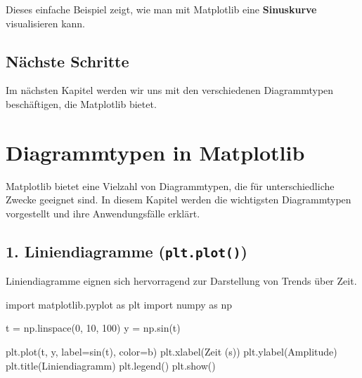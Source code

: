 \documentclass[
  letterpaper,
  DIV=11,
  numbers=noendperiod]{scrreprt}
\newenvironment{Shaded}{\begin{snugshade}}{\end{snugshade}}
\newcommand{\DecValTok}[1]{\textcolor[rgb]{0.68,0.00,0.00}{#1}}
\newcommand{\ImportTok}[1]{\textcolor[rgb]{0.00,0.46,0.62}{#1}}
\newcommand{\NormalTok}[1]{\textcolor[rgb]{0.00,0.23,0.31}{#1}}
\newcommand{\OperatorTok}[1]{\textcolor[rgb]{0.37,0.37,0.37}{#1}}
\newcommand{\StringTok}[1]{\textcolor[rgb]{0.13,0.47,0.30}{#1}}
\begin{document}
Dieses einfache Beispiel zeigt, wie man mit Matplotlib eine
\textbf{Sinuskurve} visualisieren kann.

\section{Nächste Schritte}\label{nuxe4chste-schritte}

Im nächsten Kapitel werden wir uns mit den verschiedenen Diagrammtypen
beschäftigen, die Matplotlib bietet.

\chapter{Diagrammtypen in Matplotlib}\label{diagrammtypen-in-matplotlib}

Matplotlib bietet eine Vielzahl von Diagrammtypen, die für
unterschiedliche Zwecke geeignet sind. In diesem Kapitel werden die
wichtigsten Diagrammtypen vorgestellt und ihre Anwendungsfälle erklärt.

\section{\texorpdfstring{1. Liniendiagramme
(\texttt{plt.plot()})}{1. Liniendiagramme (plt.plot())}}\label{liniendiagramme-plt.plot}

Liniendiagramme eignen sich hervorragend zur Darstellung von Trends über
Zeit.

\begin{Shaded}
\begin{Highlighting}[]
\ImportTok{import}\NormalTok{ matplotlib.pyplot }\ImportTok{as}\NormalTok{ plt}
\ImportTok{import}\NormalTok{ numpy }\ImportTok{as}\NormalTok{ np}

\NormalTok{t }\OperatorTok{=}\NormalTok{ np.linspace(}\DecValTok{0}\NormalTok{, }\DecValTok{10}\NormalTok{, }\DecValTok{100}\NormalTok{)}
\NormalTok{y }\OperatorTok{=}\NormalTok{ np.sin(t)}

\NormalTok{plt.plot(t, y, label}\OperatorTok{=}\StringTok{\textquotesingle{}sin(t)\textquotesingle{}}\NormalTok{, color}\OperatorTok{=}\StringTok{\textquotesingle{}b\textquotesingle{}}\NormalTok{)}
\NormalTok{plt.xlabel(}\StringTok{\textquotesingle{}Zeit (s)\textquotesingle{}}\NormalTok{)}
\NormalTok{plt.ylabel(}\StringTok{\textquotesingle{}Amplitude\textquotesingle{}}\NormalTok{)}
\NormalTok{plt.title(}\StringTok{\textquotesingle{}Liniendiagramm\textquotesingle{}}\NormalTok{)}
\NormalTok{plt.legend()}
\NormalTok{plt.show()}
\end{Highlighting}
\end{Shaded}
\end{document}
